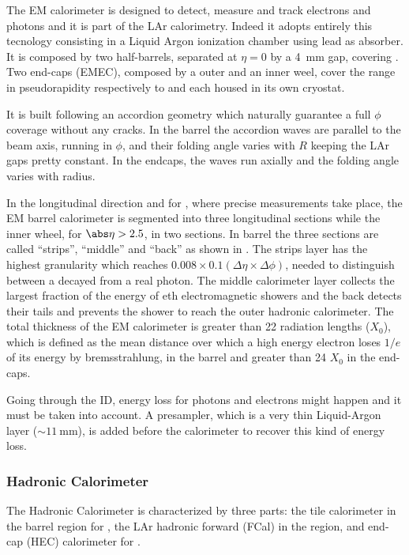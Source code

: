 The EM calorimeter is designed to detect, measure and track electrons and photons and it is part of the LAr calorimetry. Indeed it adopts entirely this tecnology consisting in a Liquid Argon ionization chamber using lead as absorber. It is composed by two half-barrels, separated at $\eta=0$ by a \SI{4}{\mm} gap, covering . Two end-caps (EMEC), composed by a outer and an inner weel, cover the range in pseudorapidity respectively to  and  each housed in its own cryostat. 

It is built following an accordion geometry which naturally guarantee a full $\phi$ coverage without any cracks. In the barrel the accordion waves are parallel to the beam axis, running in $\phi$, and their folding angle varies with $R$ keeping the LAr gaps pretty constant. In the endcaps, the waves run axially and the folding angle varies with radius.

In the longitudinal direction and for , where precise measurements take place, the EM barrel calorimeter is segmented into three longitudinal sections while the inner wheel, for $\abs\eta>2.5$, in two sections. In barrel the three sections are called ``strips'', ``middle'' and ``back'' as shown in \Fig{\ref{fig:EMlayers}}. The strips layer has the highest granularity which reaches \mbox{$0.008 \times 0.1 \left(\Delta \eta \times \Delta \phi \right)$}, needed to distinguish between a decayed \pizero from a real photon. The middle calorimeter layer collects the largest fraction of the energy of eth electromagnetic showers and the back detects their tails and prevents the shower to reach the outer hadronic calorimeter. The total thickness of the EM calorimeter is greater than 22 radiation lengths ($X_0$), which is defined as the mean distance over which a high energy electron loses $1/e$ of its energy by bremsstrahlung, in the barrel and greater than 24 $X_0$ in the end-caps.
  
Going through the ID, energy loss for photons and electrons might happen and it must be taken into account. A presampler, which is a very thin Liquid-Argon layer ($\sim \SI{11}{\mm}$), is added before the calorimeter to recover this kind of energy loss.

\subsubsection{Hadronic Calorimeter}
The Hadronic Calorimeter is characterized by three parts: the tile calorimeter in the barrel region for , the LAr hadronic forward (FCal) in the  region, and end-cap (HEC) calorimeter for . 

